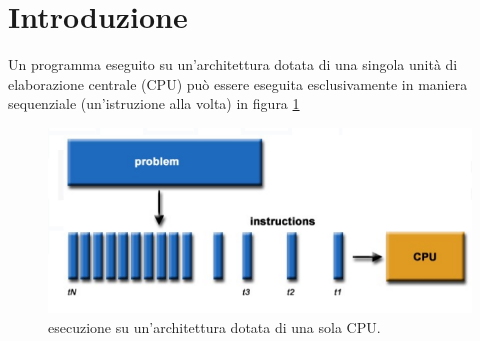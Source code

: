 \section{Introduzione}
Un programma eseguito su un'architettura dotata di una singola unità di elaborazione centrale (CPU) può essere eseguita esclusivamente in maniera sequenziale (un'istruzione alla volta) in figura \ref{fig:single-computation}
\begin{figure}[th]
	\centering
	\includegraphics[width=0.7\linewidth]{img/single-computation}
	\caption{esecuzione su un'architettura dotata di una sola CPU.}
	\label{fig:single-computation}
\end{figure}
